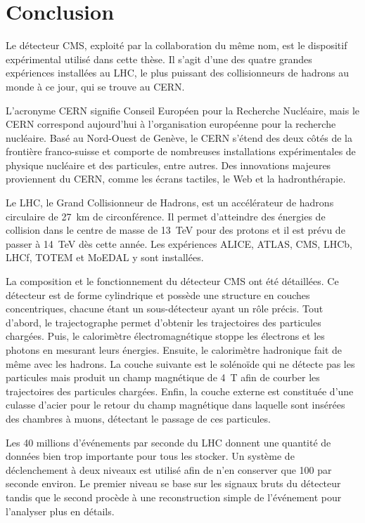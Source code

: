 \section{Conclusion}\label{chapter-LHC-section-conclusion}
Le détecteur CMS, exploité par la collaboration du même nom, est le dispositif expérimental utilisé dans cette thèse.
Il s'agit d'une des quatre grandes expériences installées au LHC, le plus puissant des collisionneurs de hadrons au monde à ce jour, qui se trouve au CERN.
\par L'acronyme \og CERN \fg{} signifie Conseil Européen pour la Recherche Nucléaire, mais le CERN correspond aujourd'hui à l'organisation européenne pour la recherche nucléaire.
Basé au Nord-Ouest de Genève, le CERN s'étend des deux côtés de la frontière franco-suisse et comporte de nombreuses installations expérimentales de physique nucléaire et des particules, entre autres.
Des innovations majeures proviennent du CERN, comme les écrans tactiles, le Web et la hadronthérapie.
\par Le LHC, le Grand Collisionneur de Hadrons, est un accélérateur de hadrons circulaire de \SI{27}{\kilo\meter} de circonférence.
Il permet d'atteindre des énergies de collision dans le centre de masse de \SI{13}{\TeV} pour des protons et il est prévu de passer à \SI{14}{\TeV} dès cette année.
Les expériences ALICE, ATLAS, CMS, LHCb, LHCf, TOTEM et MoEDAL y sont installées.
\par La composition et le fonctionnement du détecteur CMS ont été détaillées.
Ce détecteur est de forme cylindrique et possède une structure en couches concentriques, chacune étant un sous-détecteur ayant un rôle précis.
Tout d'abord, le trajectographe permet d'obtenir les trajectoires des particules chargées.
Puis, le calorimètre électromagnétique stoppe les électrons et les photons en mesurant leurs énergies.
Ensuite, le calorimètre hadronique fait de même avec les hadrons.
La couche suivante est le solénoïde qui ne détecte pas les particules mais produit un champ magnétique de \SI{4}{\tesla} afin de courber les trajectoires des particules chargées.
Enfin, la couche externe est constituée d'une culasse d'acier pour le retour du champ magnétique dans laquelle sont insérées des chambres à muons, détectant le passage de ces particules.
\par Les 40 millions d'événements par seconde du LHC donnent une quantité de données bien trop importante pour tous les stocker.
Un système de déclenchement à deux niveaux est utilisé afin de n'en conserver que 100 par seconde environ.
Le premier niveau se base sur les signaux bruts du détecteur tandis que le second procède à une reconstruction simple de l'événement pour l'analyser plus en détails.
